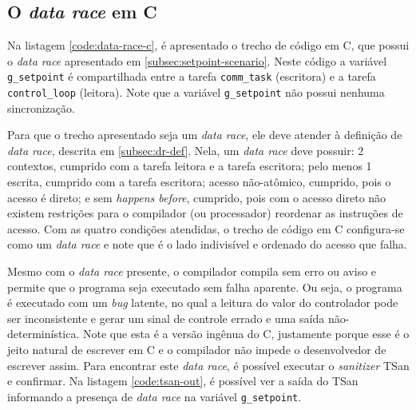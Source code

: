 \subsection{O \textit{data race} em C}
\label{subsec:setpoint-c}

Na listagem \ref{code:data-race-c}, é apresentado o trecho de código em C, que possui o \textit{data race} apresentado em \ref{subsec:setpoint-scenario}. Neste código a variável \texttt{g\_setpoint} é compartilhada entre a tarefa \texttt{comm\_task} (escritora) e a tarefa \texttt{control\_loop} (leitora). Note que a variável \texttt{g\_setpoint} não possui nenhuma sincronização.


Para que o trecho apresentado seja um \textit{data race}, ele deve atender à definição de \textit{data race}, descrita em \ref{subsec:dr-def}. Nela, um \textit{data race} deve possuir: 2 contextos, cumprido com a tarefa leitora e a tarefa escritora; pelo menos 1 escrita, cumprido com a tarefa escritora; acesso não-atômico, cumprido, pois o acesso é direto; e sem \textit{happens before}, cumprido, pois com o acesso direto não existem restrições para o compilador (ou processador) reordenar as instruções de acesso. Com as quatro condições atendidas, o trecho de código em C configura-se como um \textit{data race} e note que é o lado indivisível e ordenado do acesso que falha.

Mesmo com o \textit{data race} presente, o compilador compila sem erro ou aviso e permite que o programa seja executado sem falha aparente. Ou seja, o programa é executado com um \textit{bug} latente, no qual a leitura do valor do controlador pode ser inconsistente e gerar um sinal de controle errado e uma saída não-determinística. Note que esta é a versão ingênua do C, justamente porque esse é o jeito natural de escrever em C e o compilador não impede o desenvolvedor de escrever assim. Para encontrar este \textit{data race}, é possível executar o \textit{sanitizer} \ac{TSan} e confirmar. Na listagem \ref{code:tsan-out}, é possível ver a saída do \ac{TSan} informando a presença de \textit{data race} na variável \texttt{g\_setpoint}.

